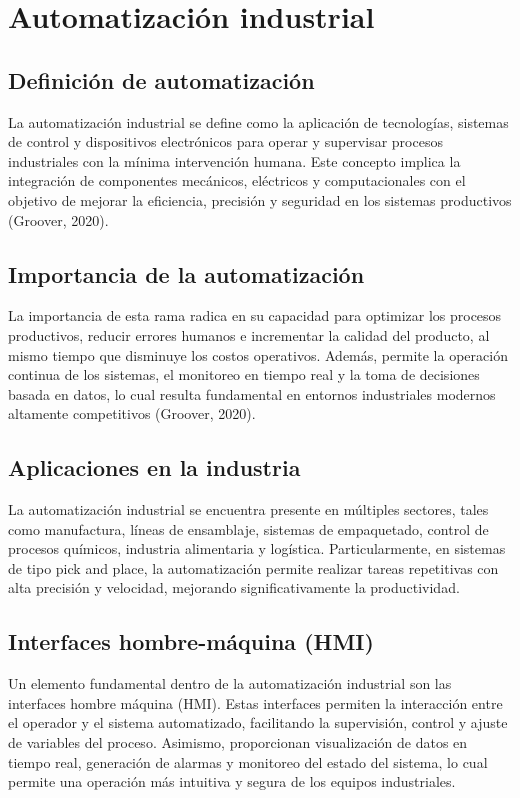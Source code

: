 \section{Automatización industrial}

\subsection{Definición de automatización}
La automatización industrial se define como la aplicación de tecnologías, sistemas de control y dispositivos electrónicos para operar y supervisar procesos industriales con la mínima intervención humana. Este concepto implica la integración de componentes mecánicos, eléctricos y computacionales con el objetivo de mejorar la eficiencia, precisión y seguridad en los sistemas productivos (Groover, 2020).

\subsection{Importancia de la automatización}
La importancia de esta rama radica en su capacidad para optimizar los procesos productivos, reducir errores humanos e incrementar la calidad del producto, al mismo tiempo que disminuye los costos operativos. Además, permite la operación continua de los sistemas, el monitoreo en tiempo real y la toma de decisiones basada en datos, lo cual resulta fundamental en entornos industriales modernos altamente competitivos (Groover, 2020).

\subsection{Aplicaciones en la industria }
La automatización industrial se encuentra presente en múltiples sectores, tales como manufactura, líneas de ensamblaje, sistemas de empaquetado, control de procesos químicos, industria alimentaria y logística. Particularmente, en sistemas de tipo pick and place, la automatización permite realizar tareas repetitivas con alta precisión y velocidad, mejorando significativamente la productividad.

\subsection{Interfaces hombre-máquina (HMI)}
Un elemento fundamental dentro de la automatización industrial son las interfaces hombre máquina (HMI). Estas interfaces permiten la interacción entre el operador y el sistema automatizado, facilitando la supervisión, control y ajuste de variables del proceso. Asimismo, proporcionan visualización de datos en tiempo real, generación de alarmas y monitoreo del estado del sistema, lo cual permite una operación más intuitiva y segura de los equipos industriales.

